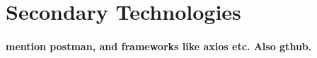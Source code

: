 

\section{Secondary Technologies}
\paragraph{mention postman, and frameworks like axios etc. Also gthub.}